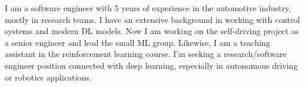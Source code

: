 I am a software engineer with 5 years of experience in the automotive industry,
mostly in research teams. I have an extensive background in working with control
systems and modern DL models. Now I am working on the self-driving project as a
senior engineer and lead the small ML group. Likewise, I am a teaching assistant
in the reinforcement learning course. I'm seeking a research/software engineer
position connected with deep learning, especially in autonomous driving or
robotics applications.